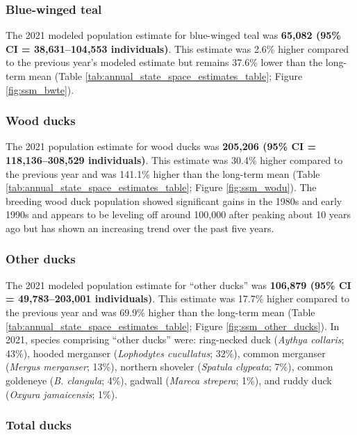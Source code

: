 \documentclass[
  12pt,
]{article}
\begin{document}
\hypertarget{blue-winged-teal}{%
\subsubsection{Blue-winged teal}\label{blue-winged-teal}}

The 2021 modeled population estimate for blue-winged teal was
\textbf{65,082 (95\% CI = 38,631--104,553 individuals)}. This estimate
was 2.6\% higher compared to the previous year's modeled estimate but
remains 37.6\% lower than the long-term mean (Table
\ref{tab:annual_state_space_estimates_table}; Figure
\ref{fig:ssm_bwte}).

\hypertarget{wood-ducks}{%
\subsubsection{Wood ducks}\label{wood-ducks}}

The 2021 population estimate for wood ducks was \textbf{205,206 (95\% CI
= 118,136--308,529 individuals)}. This estimate was 30.4\% higher
compared to the previous year and was 141.1\% higher than the long-term
mean (Table \ref{tab:annual_state_space_estimates_table}; Figure
\ref{fig:ssm_wodu}). The breeding wood duck population showed
significant gains in the 1980s and early 1990s and appears to be
leveling off around 100,000 after peaking about 10 years ago but has
shown an increasing trend over the past five years.

\hypertarget{other-ducks}{%
\subsubsection{Other ducks}\label{other-ducks}}

The 2021 modeled population estimate for ``other ducks'' was
\textbf{106,879 (95\% CI = 49,783--203,001 individuals)}. This estimate
was 17.7\% higher compared to the previous year and was 69.9\% higher
than the long-term mean (Table
\ref{tab:annual_state_space_estimates_table}; Figure
\ref{fig:ssm_other_ducks}). In 2021, species comprising ``other ducks''
were: ring-necked duck (\emph{Aythya collaris}; 43\%), hooded merganser
(\emph{Lophodytes cucullatus}; 32\%), common merganser (\emph{Mergus
merganser}; 13\%), northern shoveler (\emph{Spatula clypeata}; 7\%),
common goldeneye (\emph{B. clangula}; 4\%), gadwall (\emph{Mareca
strepera}; 1\%), and ruddy duck (\emph{Oxyura jamaicensis}; 1\%).

\hypertarget{total-ducks}{%
\subsubsection{Total ducks}\label{total-ducks}}
\end{document}
